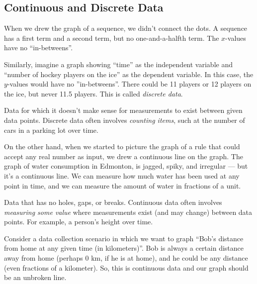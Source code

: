 \subsection{Continuous and Discrete Data}

When we drew the graph of a sequence, we didn't connect the dots. A sequence has a first term and a second term, but no one-and-a-halfth term. The $x$-values have no ``in-betweens''.

Similarly, imagine a graph showing ``time'' as the independent variable and ``number of hockey players on the ice'' as the dependent variable. In this case, the $y$-values would have no ''in-betweens''. There could be 11 players or 12 players on the ice, but never 11.5 players. This is called \textit{discrete data}.

\begin{boxeddef}
Data for which it doesn't make sense for measurements to exist between given data points. Discrete data often involves \textit{counting items}, such at the number of cars in a parking lot over time. 
\end{boxeddef}

On the other hand, when we started to picture the graph of a rule that could accept any real number as input, we drew a continuous line on the graph. The graph of water consumption in Edmonton, is jagged, spiky, and irregular --- but it's a continuous line. We can measure how much water has been used at any point in time, and we can measure the amount of water in fractions of a unit.

\begin{boxeddef}
Data that has no holes, gaps, or breaks. Continuous data often involves \textit{measuring some value} where measurements exist (and may change) between data points. For example, a person's height over time.
\end{boxeddef}


Consider a data collection scenario in which we want to graph ``Bob's distance from home at any given time (in kilometers)''. Bob is always a certain distance away from home (perhaps 0 km, if he is at home), and he could be any distance (even fractions of a kilometer). So, this is continuous data and our graph should be an unbroken line.

